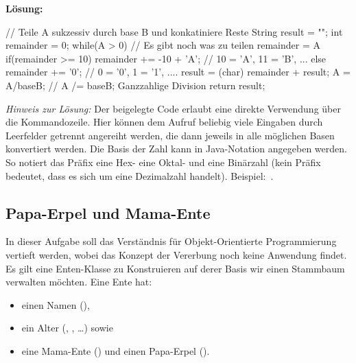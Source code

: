 \documentclass[table]{sopra-base}
\makeatletter
\let\T\texttt
\newenvironment{solution}{\null\par\noindent\textbf{\textcolor{sob@col@uulm@cs}{Lösung:}}\newline\bgroup\color{black}\slshape\ignorespaces}{\egroup}
\makeatother
\begin{document}
\begin{solution}
{\begin{java}[firstnumber=81,morekeywords={[4]{ROM}}]
{    // Teile A sukzessiv durch base B und konkatiniere Reste
    String result = ""; 
    int remainder = 0;
    while(A > 0) {// Es gibt noch was zu teilen
        remainder = A %
        if(remainder >= 10)
            remainder += -10 + 'A'; // 10 = 'A', 11 = 'B', ...
        else remainder += '0'; // 0 = '0', 1 = '1', ....
        result = (char) remainder + result;
        A = A/baseB; // A /= baseB; Ganzzahlige Division
    }
    return result;
}
    \end{java}
    }
    \textit{Hinweis zur Lösung:} Der beigelegte Code erlaubt eine direkte Verwendung über die Kommandozeile. Hier können dem Aufruf  beliebig viele Eingaben durch Leerfelder getrennt angereiht werden, die dann jeweils in alle möglichen Basen konvertiert werden. Die Basis der Zahl kann in Java-Notation angegeben werden. So notiert das Präfix \say{\T{0x}} eine Hex- \say{\T{0o}} eine Oktal- und \say{\T{0b}} eine Binärzahl (kein Präfix bedeutet, dass es sich um eine Dezimalzahl handelt). Beispiel:
    \,.
\end{solution}

\subsection{Papa-Erpel und Mama-Ente}

\label{sec:duckfamily}In dieser Aufgabe soll das Verständnis für Objekt-Orientierte Programmierung vertieft werden, wobei das Konzept der Vererbung noch keine Anwendung findet.
Es gilt eine Enten-Klasse zu Konstruieren auf derer Basis wir einen Stammbaum verwalten möchten. Eine Ente hat:
\begin{itemize}[nolistsep]
    \item einen Namen (),
    \item ein Alter (, , \ldots) sowie
    \item eine Mama-Ente () und einen Papa-Erpel ().
\end{itemize}
\end{document}

